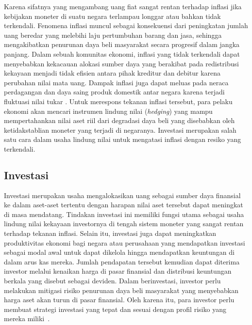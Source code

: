 Karena sifatnya yang mengambang uang fiat sangat rentan terhadap inflasi jika kebijakan moneter di suatu negara terlampau longgar atau bahkan tidak terkendali. Fenomena inflasi muncul sebagai konsekuensi dari peningkatan jumlah uang beredar yang melebihi laju pertumbuhan barang dan jasa, sehingga mengakibatkan penurunan daya beli masyarakat secara progresif dalam jangka panjang. Dalam sebuah komunitas ekonomi, inflasi yang tidak terkendali dapat menyebabkan kekacauan alokasi sumber daya yang berakibat pada redistribusi kekayaan menjadi tidak efisien antara pihak kreditur dan debitur karena perubahan nilai mata uang. Dampak inflasi juga dapat meluas pada neraca perdagangan dan daya saing produk domestik antar negara karena terjadi fluktuasi nilai tukar \cite{gabaix_behavioral_2020}. Untuk merespons tekanan inflasi tersebut, para pelaku ekonomi akan mencari instrumen lindung nilai (\textit{hedging}) yang mampu mempertahankan nilai aset riil dari degradasi daya beli yang disebabkan oleh ketidakstablian moneter yang terjadi di negaranya. Investasi merupakan salah satu cara dalam usaha lindung nilai untuk mengatasi inflasi dengan resiko yang terkendali.

\subsection{Investasi}
Investasi merupakan usaha mengalokasikan uang sebagai sumber daya finansial ke dalam aset-aset tertentu dengan harapan nilai aset tersebut dapat meningkat di masa mendatang. Tindakan investasi ini memiliki fungsi utama sebagai usaha lindung nilai kekayaan investornya di tengah sistem moneter yang sangat rentan terhadap tekanan inflasi. Selain itu, investasi juga dapat meningkatkan produktivitas ekonomi bagi negara atau perusahaan yang mendapatkan investasi sebagai modal awal untuk dapat dikelola hingga mendapatkan keuntungan di dalam arus kas mereka. Jumlah pendapatan tersebut kemudian dapat diterima investor melalui kenaikan harga di pasar finansial dan distribusi keuntungan berkala yang disebut sebagai deviden. Dalam berinvestasi, investor perlu melakukan mitigasi risiko penurunan daya beli masyarakat yang menyebabkan harga aset akan turun di pasar finansial. Oleh karena itu, para investor perlu membuat strategi investasi yang tepat dan sesuai dengan profil risiko yang mereka miliki~.

